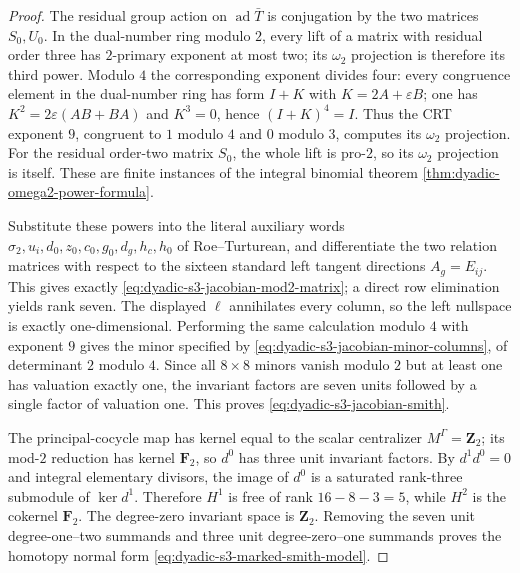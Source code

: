 \documentclass[11pt]{article}
\theoremstyle{definition}
\begin{document}
\begin{proof}
The residual group action on
$\operatorname{ad}\bar T$ is
conjugation by the two matrices
$S_0,U_0$.  In the dual-number
ring modulo $2$, every lift
of a matrix with residual order
three has $2$-primary exponent
at most two; its $\omega_2$
projection is therefore its third
power.  Modulo $4$ the corresponding
exponent divides four: every congruence
element in the dual-number ring has form
$I+K$ with $K=2A+\varepsilon B$;
one has $K^2=2\varepsilon(AB+BA)$
and $K^3=0$, hence $(I+K)^4=I$.
Thus the CRT exponent $9$, congruent
to $1$ modulo $4$ and $0$ modulo $3$,
computes its $\omega_2$ projection.
For the residual order-two matrix
$S_0$, the whole lift is pro-$2$,
so its $\omega_2$ projection is
itself.  These are finite instances
of the integral binomial theorem
\ref{thm:dyadic-omega2-power-formula}.

Substitute these powers into the
literal auxiliary words
$\sigma_2,u_i,d_0,z_0,c_0,g_0,
d_g,h_c,h_0$
of Roe--Turturean, and differentiate
the two relation matrices with
respect to the sixteen standard
left tangent directions
$A_g=E_{ij}$.
This gives exactly
\eqref{eq:dyadic-s3-jacobian-mod2-matrix};
a direct row elimination yields
rank seven.
The displayed $\ell$ annihilates
every column, so the left
nullspace is exactly one-dimensional.
Performing the same calculation
modulo $4$ with exponent $9$
gives the minor specified by
\eqref{eq:dyadic-s3-jacobian-minor-columns},
of determinant $2$ modulo $4$.
Since all $8\times8$ minors
vanish modulo $2$ but at least one
has valuation exactly one,
the invariant factors are seven
units followed by a single factor
of valuation one.  This proves
\eqref{eq:dyadic-s3-jacobian-smith}.

The principal-cocycle map has
kernel equal to the scalar
centralizer $M^\Gamma=\mathbf Z_2$;
its mod-$2$ reduction has kernel
$\mathbf F_2$, so $d^0$ has
three unit invariant factors.
By $d^1d^0=0$ and integral
elementary divisors, the image
of $d^0$ is a saturated rank-three
submodule of $\ker d^1$.
Therefore $H^1$ is free of
rank $16-8-3=5$, while $H^2$
is the cokernel $\mathbf F_2$.
The degree-zero invariant
space is $\mathbf Z_2$.
Removing the seven unit
degree-one--two summands and
three unit degree-zero--one
summands proves the homotopy
normal form
\eqref{eq:dyadic-s3-marked-smith-model}.
\end{proof}
\end{document}
